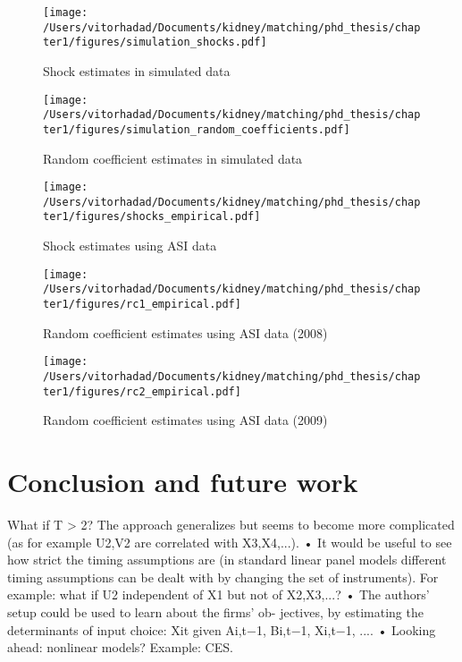 \begin{figure}
  \centering
  \texttt{[image: /Users/vitorhadad/Documents/kidney/matching/phd\_thesis/chapter1/figures/simulation\_shocks.pdf]}
  \label{fig:simulation_shocks}
  \caption[Shock estimates in simulated data]{Shock estimates in simulated data}
\end{figure}

\begin{figure}
  \centering
  \texttt{[image: /Users/vitorhadad/Documents/kidney/matching/phd\_thesis/chapter1/figures/simulation\_random\_coefficients.pdf]}
  \label{fig:simulation_random_coefficients}
  \caption[Random coefficient estimates in simulated data]{Random coefficient estimates in simulated data}
\end{figure}

\begin{figure}
  \centering
  \texttt{[image: /Users/vitorhadad/Documents/kidney/matching/phd\_thesis/chapter1/figures/shocks\_empirical.pdf]}
  \caption[Shock estimates using ASI data]{Shock estimates using ASI data}
\end{figure}


\begin{figure}
  \centering
  \texttt{[image: /Users/vitorhadad/Documents/kidney/matching/phd\_thesis/chapter1/figures/rc1\_empirical.pdf]}
  \caption[Random coefficient estimates using ASI data (2008)]{Random coefficient estimates using ASI data (2008)}
\end{figure}

\begin{figure}
  \centering
  \texttt{[image: /Users/vitorhadad/Documents/kidney/matching/phd\_thesis/chapter1/figures/rc2\_empirical.pdf]}
    \caption[Random coefficient estimates using ASI data (2009)]{Random coefficient estimates using ASI data (2009)}
\end{figure}





\clearpage


\section{Conclusion and future work}


What if T > 2? The approach generalizes but seems to become more complicated (as for example U2,V2 are correlated with X3,X4,...).
• It would be useful to see how strict the timing assumptions are (in standard linear panel models different timing assumptions can be dealt with by changing the set of instruments). For example: what if U2 independent of X1 but not of X2,X3,...?
• The authors’ setup could be used to learn about the firms’ ob- jectives, by estimating the determinants of input choice: Xit given
Ai,t−1, Bi,t−1, Xi,t−1, ....
• Looking ahead: nonlinear models? Example: CES.


